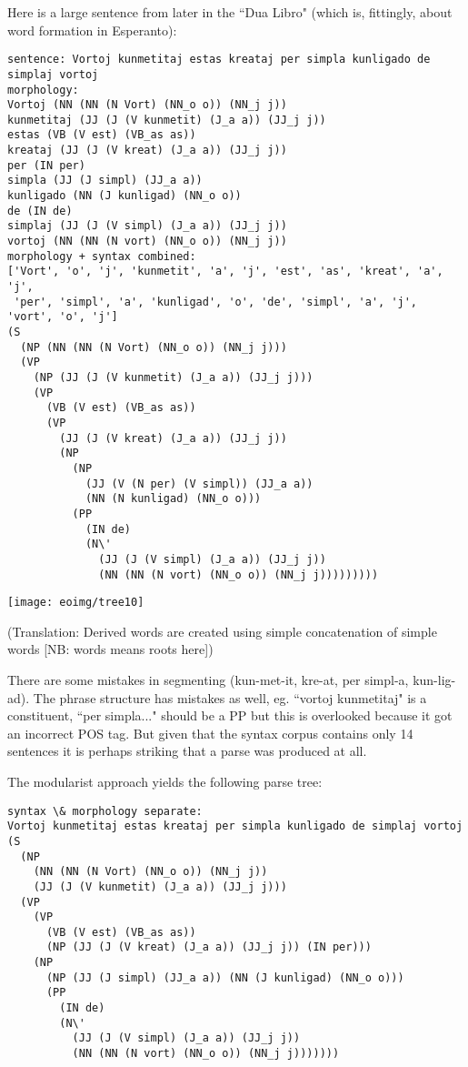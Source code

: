 \documentclass[10pt,a4paper]{article}
\begin{document}
Here is a large sentence from later in the ``Dua Libro" (which is, fittingly,
about word formation in Esperanto):

\begin{verbatim}
sentence: Vortoj kunmetitaj estas kreataj per simpla kunligado de simplaj vortoj
morphology:
Vortoj (NN (NN (N Vort) (NN_o o)) (NN_j j))
kunmetitaj (JJ (J (V kunmetit) (J_a a)) (JJ_j j))
estas (VB (V est) (VB_as as))
kreataj (JJ (J (V kreat) (J_a a)) (JJ_j j))
per (IN per)
simpla (JJ (J simpl) (JJ_a a))
kunligado (NN (J kunligad) (NN_o o))
de (IN de)
simplaj (JJ (J (V simpl) (J_a a)) (JJ_j j))
vortoj (NN (NN (N vort) (NN_o o)) (NN_j j))
morphology + syntax combined:
['Vort', 'o', 'j', 'kunmetit', 'a', 'j', 'est', 'as', 'kreat', 'a', 'j', 
 'per', 'simpl', 'a', 'kunligad', 'o', 'de', 'simpl', 'a', 'j', 'vort', 'o', 'j']
(S
  (NP (NN (NN (N Vort) (NN_o o)) (NN_j j)))
  (VP
    (NP (JJ (J (V kunmetit) (J_a a)) (JJ_j j)))
    (VP
      (VB (V est) (VB_as as))
      (VP
        (JJ (J (V kreat) (J_a a)) (JJ_j j))
        (NP
          (NP
            (JJ (V (N per) (V simpl)) (JJ_a a))
            (NN (N kunligad) (NN_o o)))
          (PP
            (IN de)
            (N\'
              (JJ (J (V simpl) (J_a a)) (JJ_j j))
              (NN (NN (N vort) (NN_o o)) (NN_j j)))))))))
\end{verbatim}

\texttt{[image: eoimg/tree10]}

(Translation: Derived words are created using simple concatenation of simple
words [NB: words means roots here])

There are some mistakes in segmenting (kun-met-it, kre-at, per simpl-a,
kun-lig-ad).  The phrase structure has mistakes as well, eg. ``vortoj
kunmetitaj" is a constituent, ``per simpla..." should be a PP but this is
overlooked because it got an incorrect POS tag. But given that the syntax
corpus contains only 14 sentences it is perhaps striking that a parse was
produced at all.

The modularist approach yields the following parse tree:

\begin{verbatim}
syntax \& morphology separate:
Vortoj kunmetitaj estas kreataj per simpla kunligado de simplaj vortoj 
(S
  (NP
    (NN (NN (N Vort) (NN_o o)) (NN_j j))
    (JJ (J (V kunmetit) (J_a a)) (JJ_j j)))
  (VP
    (VP
      (VB (V est) (VB_as as))
      (NP (JJ (J (V kreat) (J_a a)) (JJ_j j)) (IN per)))
    (NP
      (NP (JJ (J simpl) (JJ_a a)) (NN (J kunligad) (NN_o o)))
      (PP
        (IN de)
        (N\'
          (JJ (J (V simpl) (J_a a)) (JJ_j j))
          (NN (NN (N vort) (NN_o o)) (NN_j j)))))))
\end{verbatim}
\end{document}
